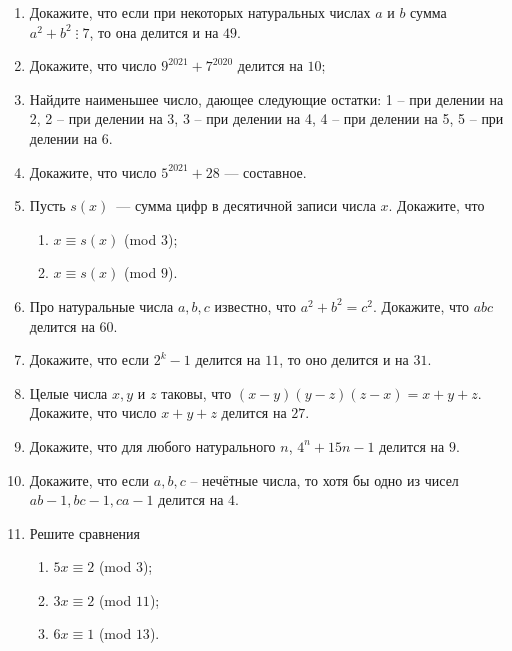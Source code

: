 \documentclass{article}
\begin{document}
\begin{enumerate}[label*=\protect\fbox{\arabic{enumi}}]
	\item Докажите, что если при некоторых натуральных числах $a$ и $b$ сумма $a^2 + b^2\; \vdots \; 7$,
	то она делится и на $49$.
	
	\item Докажите, что число $9^{2021} + 7^{2020}$ делится на $10$;
	
	\item Найдите наименьшее число, дающее следующие остатки: 1 – при делении на 2, 2 – при делении на 3, 3 – при делении на 4, 4 – при делении на 5, 5 – при делении на 6.
	
	\item Докажите, что число $5^{2021} + 28$ — составное.
	
	\item Пусть $s(x)$~--- сумма цифр в десятичной записи числа $x$. Докажите, что
	\begin{enumerate}
		\item $x \equiv s(x)$ (mod $3$);
		
		\item $x \equiv s(x)$ (mod $9$).
	\end{enumerate}
	
	\item Про натуральные числа $a, b, c$ известно, что $a^2 + b^2 = c^2$. Докажите, что $abc$
	делится на $60$.
	
	\item Докажите, что если $2^k - 1$ делится на $11$, то оно делится и на $31$.
	
	\item Целые числа $x, y$ и $z$ таковы, что  $(x - y)(y - z)(z - x) = x + y + z$.  Докажите, что число  $x + y + z$  делится на $27$.
	
	\item Докажите, что для любого натурального $n$, $4^n + 15n - 1$ делится на $9$.
	
	\item Докажите, что если $a, b, c$ – нечётные числа, то хотя бы одно из чисел  $ab - 1,  bc - 1,  ca - 1$ делится на $4$.
	
	\item Решите сравнения
	
	\begin{enumerate}
		\item $5x \equiv 2$ (mod $3$);
		
		\item $3x \equiv 2$ (mod $11$);
		
		\item $6x \equiv 1$ (mod $13$).
	\end{enumerate}
	
	

\end{enumerate}
\end{document}
